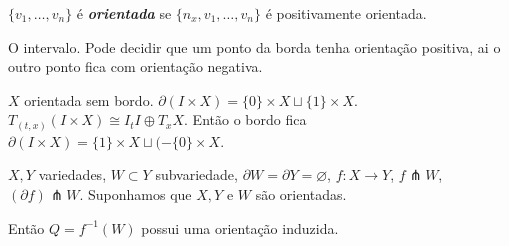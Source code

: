 \begin{defn}\leavevmode
\(\{v_1,\ldots,v_n\}\) é \textit{\textbf{orientada}} se \(\{n_x,v_1,\ldots,v_n\}\) é positivamente orientada.
\end{defn}

\begin{example}\leavevmode
O intervalo. Pode decidir que um ponto da borda tenha orientação positiva, ai o outro ponto fica com orientação negativa.

\(X\) orientada sem bordo. \(\partial  (I\times X)=\{0\}\times X \sqcup \{1\}\times X\). \(T_{(t,x)}(I \times X) \cong I_t I \oplus  T_xX\). Então o bordo fica \(\partial (I \times X)= \{1\}\times X \sqcup (- \{ 0\} \times X\).
\end{example}

\begin{prop}\leavevmode
\(X,Y\) variedades, \(W \subset Y\) subvariedade, \(\partial W=\partial Y=\varnothing\), \(f: X \to Y\), \(f \pitchfork W\), \((\partial f)\pitchfork W\). Suponhamos que \(X, Y\) e \(W\) são orientadas.

Então  \(Q= f^{-1}(W)\) possui uma orientação induzida.
\end{prop}








































